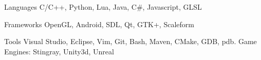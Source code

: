 


\begin{cvskills}


\cvskill
{Languages} %
{C/C++, Python, Lua, Java, C\#, Javascript, GLSL } %

\cvskill
{Frameworks}
{OpenGL, Android, SDL, Qt, GTK+, Scaleform}

\cvskill
{Tools}
{Visual Studio, Eclipse, Vim, Git, Bash, Maven, CMake, GDB, pdb. Game Engines: Stingray, Unity3d, Unreal}



\end{cvskills}

